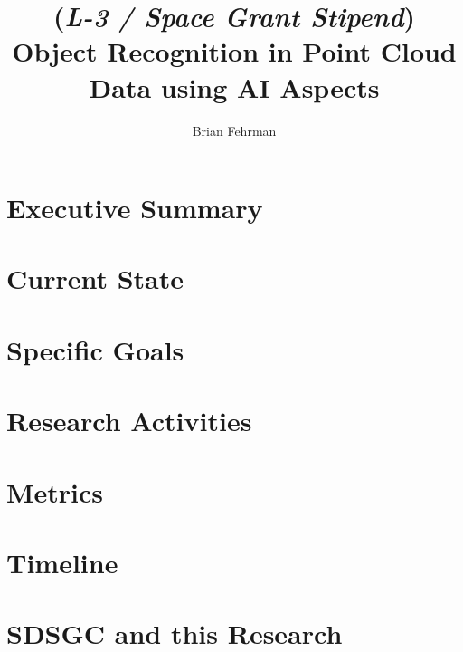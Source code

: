 \documentclass[10pt,letterpaper]{article}
\author{Brian Fehrman}
\title{(\emph{L-3 / Space Grant Stipend}) \\ Object Recognition in Point Cloud Data using AI Aspects}
\begin{document}
\maketitle

\section*{Executive Summary}


\section*{Current State}


\section*{Specific Goals}


\section*{Research Activities}


\section*{Metrics}


\section*{Timeline}


\section*{SDSGC and this Research}


\newpage


\end{document}
